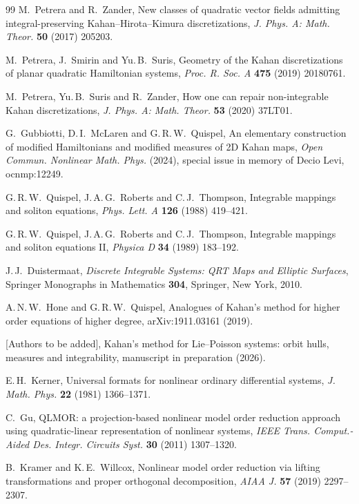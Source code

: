 \documentclass[11pt,a4paper]{article}
\theoremstyle{definition}
\theoremstyle{remark}
\begin{document}
\begin{thebibliography}{99}
 M.~Petrera and R.~Zander, New classes of quadratic vector fields admitting
integral-preserving Kahan--Hirota--Kimura discretizations, \emph{J. Phys. A: Math. Theor.} \textbf{50} (2017)
205203.

 M.~Petrera, J.~Smirin and Yu.\,B.~Suris, Geometry of the Kahan discretizations of planar
quadratic Hamiltonian systems, \emph{Proc. R. Soc. A} \textbf{475} (2019) 20180761.

 M.~Petrera, Yu.\,B.~Suris and R.~Zander, How one can repair non-integrable Kahan
discretizations, \emph{J. Phys. A: Math. Theor.} \textbf{53} (2020) 37LT01.

 G.~Gubbiotti, D.\,I.~McLaren and G.\,R.\,W.~Quispel, An elementary construction of modified
Hamiltonians and modified measures of 2D Kahan maps, \emph{Open Commun. Nonlinear Math. Phys.} (2024),
special issue in memory of Decio Levi, ocnmp:12249.

 G.\,R.\,W.~Quispel, J.\,A.\,G.~Roberts and C.\,J.~Thompson, Integrable mappings and soliton
equations, \emph{Phys. Lett. A} \textbf{126} (1988) 419--421.

 G.\,R.\,W.~Quispel, J.\,A.\,G.~Roberts and C.\,J.~Thompson, Integrable mappings and soliton
equations II, \emph{Physica D} \textbf{34} (1989) 183--192.

 J.\,J.~Duistermaat, \emph{Discrete Integrable Systems: QRT Maps and Elliptic Surfaces},
Springer Monographs in Mathematics \textbf{304}, Springer, New York, 2010.

 A.\,N.\,W.~Hone and G.\,R.\,W.~Quispel, Analogues of Kahan's method for higher order
equations of higher degree, arXiv:1911.03161 (2019).

 [Authors to be added], Kahan's method for Lie--Poisson systems: orbit hulls, measures and
integrability, manuscript in preparation (2026).

 E.\,H.~Kerner, Universal formats for nonlinear ordinary differential systems, \emph{J. Math.
Phys.} \textbf{22} (1981) 1366--1371.

 C.~Gu, QLMOR: a projection-based nonlinear model order reduction approach using
quadratic-linear representation of nonlinear systems, \emph{IEEE Trans. Comput.-Aided Des. Integr. Circuits
Syst.} \textbf{30} (2011) 1307--1320.

 B.~Kramer and K.\,E.~Willcox, Nonlinear model order reduction via lifting
transformations and proper orthogonal decomposition, \emph{AIAA J.} \textbf{57} (2019) 2297--2307.


\end{thebibliography}
\end{document}
